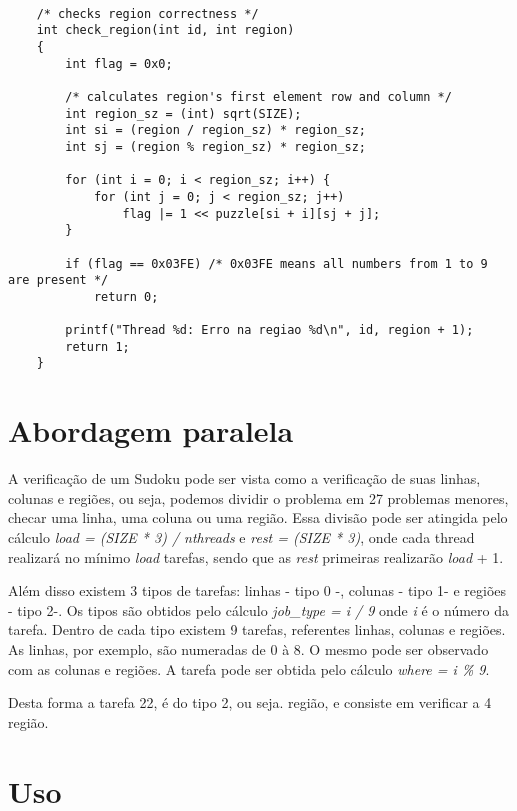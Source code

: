 \documentclass[a4paper, 12pt]{article}
\begin{document}
\begin{verbatim}

    /* checks region correctness */
    int check_region(int id, int region)
    {
        int flag = 0x0;

        /* calculates region's first element row and column */
        int region_sz = (int) sqrt(SIZE);
        int si = (region / region_sz) * region_sz;
        int sj = (region % region_sz) * region_sz;

        for (int i = 0; i < region_sz; i++) {
            for (int j = 0; j < region_sz; j++)
                flag |= 1 << puzzle[si + i][sj + j];
        }

        if (flag == 0x03FE) /* 0x03FE means all numbers from 1 to 9 are present */
            return 0;

        printf("Thread %d: Erro na regiao %d\n", id, region + 1);
        return 1;
    }

\end{verbatim}


\section{Abordagem paralela}
A verificação de um Sudoku pode ser vista como a verificação de suas linhas,
colunas e regiões, ou seja, podemos dividir o problema em 27 problemas menores,
checar uma linha, uma coluna ou uma região.
Essa divisão pode ser atingida pelo cálculo \textit{load = (SIZE * 3) / nthreads} e
\textit{rest = (SIZE * 3)}, onde cada thread realizará no mínimo \textit{load} 
tarefas, sendo que as \textit{rest} primeiras realizarão \textit{load} + 1.
\par
Além disso existem 3 tipos de tarefas: linhas - tipo 0 -, colunas - tipo 1-  e
regiões - tipo 2-. Os tipos são obtidos pelo cálculo \textit{job\_type = i / 9}
onde \textit{i} é o número da tarefa. Dentro de cada tipo existem 9 tarefas, 
referentes linhas, colunas e regiões. As linhas, por exemplo, são numeradas de 
0 à 8. O mesmo pode ser observado com as colunas e regiões. A tarefa pode ser 
obtida pelo cálculo \textit{where = i \% 9}.
\par
Desta forma a tarefa 22, é do tipo 2, ou seja. região, e consiste em verificar
a 4 região.


\section{Uso}
\end{document}
